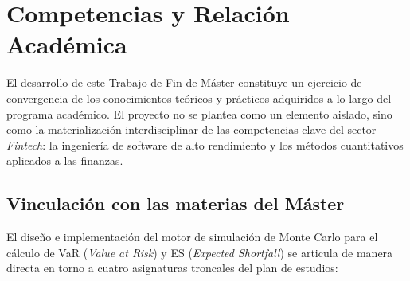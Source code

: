 \documentclass[11pt]{article}
\begin{document}
\section{Competencias y Relación Académica}

El desarrollo de este Trabajo de Fin de Máster constituye un ejercicio de convergencia de los conocimientos teóricos y prácticos adquiridos a lo largo del programa académico. El proyecto no se plantea como un elemento aislado, sino como la materialización interdisciplinar de las competencias clave del sector \textit{Fintech}: la ingeniería de software de alto rendimiento y los métodos cuantitativos aplicados a las finanzas.

\subsection{Vinculación con las materias del Máster}

El diseño e implementación del motor de simulación de Monte Carlo para el cálculo de VaR (\textit{Value at Risk}) y ES (\textit{Expected Shortfall}) se articula de manera directa en torno a cuatro asignaturas troncales del plan de estudios:
\end{document}
